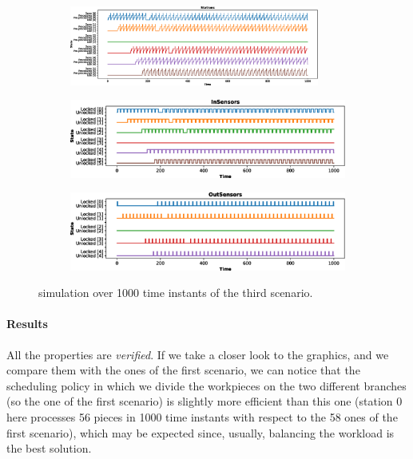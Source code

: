\documentclass[a4paper]{article}
\begin{document}
    \begin{figure}[h!]
        \begin{subfigure}{\textwidth}
            \centering
            \includegraphics[width=0.9\textwidth]{images/scenarios/scenario3_stations}
        \end{subfigure}
        \begin{subfigure}{0.49\textwidth}
            \centering
            \includegraphics[width=\textwidth]{images/scenarios/scenario3_insensors}
        \end{subfigure}
        \hfill
        \begin{subfigure}{0.49\textwidth}
            \centering
            \includegraphics[width=\textwidth]{images/scenarios/scenario3_outsensors}
        \end{subfigure}
        \caption{simulation over 1000 time instants of the third scenario.}
        \label{figure:scenario:3}
    \end{figure}

    \paragraph{Results} All the properties are \textit{verified}. If we take a closer look to the graphics, and we compare them with the ones of the first scenario, we can notice that the scheduling policy in which we divide the workpieces on the two different branches (so the one of the first scenario) is slightly more efficient than this one (station 0 here processes 56 pieces in 1000 time instants with respect to the 58 ones of the first scenario), which may be expected since, usually, balancing the workload is the best solution.
\end{document}

